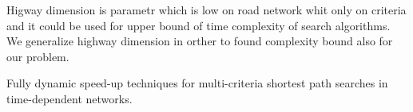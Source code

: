 Higway dimension  \cite{abraham2010highway} is parametr which 
is low on road network whit only on criteria
and it could be used for upper bound of time complexity of search 
algorithms. We generalize highway dimension in orther to found 
complexity bound also for our problem.



Fully dynamic speed-up techniques for multi-criteria shortest path searches in time-dependent networks.
\cite{berger2010fully}

\cite{holte2016bidirectional}
\cite{abraham2012hierarchical}





